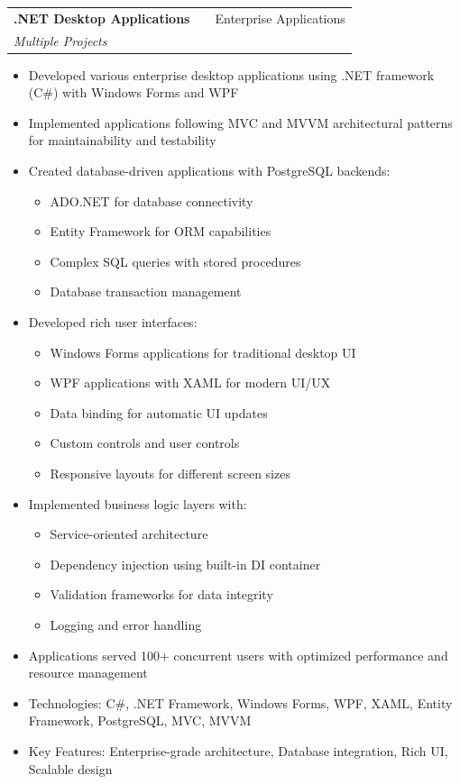 \documentclass[a4paper,12pt]{article}
\makeatletter
\newenvironment{projectdetailed}[3]
    {
    \begin{tabularx}{\linewidth}{@{}l X r@{}}
    \textbf{#1} & \hfill & #2 \\
    \textit{#3} & & \\[3.75pt]
    \end{tabularx}
    \begin{minipage}[t]{\linewidth}
    \begin{itemize}[nosep,after=\strut, leftmargin=1em, itemsep=2pt,label=--]
    }
    {
    \end{itemize}
    \end{minipage}
    \vspace{6pt}
    }
\makeatother
\begin{document}
\begin{projectdetailed}{.NET Desktop Applications}{Enterprise Applications}{Multiple Projects}
\item Developed various enterprise desktop applications using .NET framework (C\#) with Windows Forms and WPF
\item Implemented applications following MVC and MVVM architectural patterns for maintainability and testability
\item Created database-driven applications with PostgreSQL backends:
\begin{itemize}[nosep, leftmargin=2em]
    \item ADO.NET for database connectivity
    \item Entity Framework for ORM capabilities
    \item Complex SQL queries with stored procedures
    \item Database transaction management
\end{itemize}
\item Developed rich user interfaces:
\begin{itemize}[nosep, leftmargin=2em]
    \item Windows Forms applications for traditional desktop UI
    \item WPF applications with XAML for modern UI/UX
    \item Data binding for automatic UI updates
    \item Custom controls and user controls
    \item Responsive layouts for different screen sizes
\end{itemize}
\item Implemented business logic layers with:
\begin{itemize}[nosep, leftmargin=2em]
    \item Service-oriented architecture
    \item Dependency injection using built-in DI container
    \item Validation frameworks for data integrity
    \item Logging and error handling
\end{itemize}
\item Applications served 100+ concurrent users with optimized performance and resource management
\item Technologies: C\#, .NET Framework, Windows Forms, WPF, XAML, Entity Framework, PostgreSQL, MVC, MVVM
\item Key Features: Enterprise-grade architecture, Database integration, Rich UI, Scalable design
\end{projectdetailed}
\end{document}
